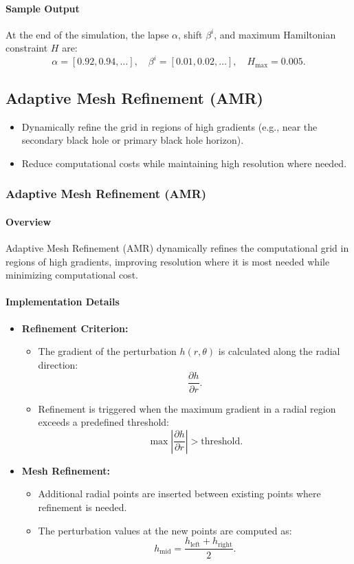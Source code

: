 \documentclass[12pt]{article}
\begin{document}
\paragraph{Sample Output}
At the end of the simulation, the lapse $\alpha$, shift $\beta^i$, and maximum Hamiltonian constraint $H$ are:
\[
\alpha = [0.92, 0.94, \dots], \quad \beta^i = [0.01, 0.02, \dots], \quad H_{\text{max}} = 0.005.
\]


\subsection{Adaptive Mesh Refinement (AMR)}
\begin{itemize}
    \item Dynamically refine the grid in regions of high gradients (e.g., near the secondary black hole or primary black hole horizon).
    \item Reduce computational costs while maintaining high resolution where needed.
\end{itemize}

\subsubsection{Adaptive Mesh Refinement (AMR)}

\paragraph{Overview}
Adaptive Mesh Refinement (AMR) dynamically refines the computational grid in regions of high gradients, improving resolution where it is most needed while minimizing computational cost.

\paragraph{Implementation Details}
\begin{itemize}
    \item \textbf{Refinement Criterion:}
    \begin{itemize}
        \item The gradient of the perturbation $h(r, \theta)$ is calculated along the radial direction:
        \[
        \frac{\partial h}{\partial r}.
        \]
        \item Refinement is triggered when the maximum gradient in a radial region exceeds a predefined threshold:
        \[
        \max \left| \frac{\partial h}{\partial r} \right| > \text{threshold}.
        \]
    \end{itemize}
    \item \textbf{Mesh Refinement:}
    \begin{itemize}
        \item Additional radial points are inserted between existing points where refinement is needed.
        \item The perturbation values at the new points are computed as:
        \[
        h_{\text{mid}} = \frac{h_{\text{left}} + h_{\text{right}}}{2}.
        \]
    \end{itemize}
\end{itemize}
\end{document}
